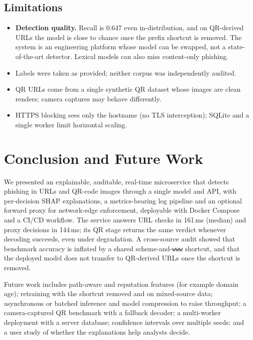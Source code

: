 \documentclass[conference]{IEEEtran}
\begin{document}
\subsection{Limitations}
\begin{itemize}
\item \textbf{Detection quality.} Recall is 0.647 even in-distribution, and on QR-derived URLs the model is close to chance once the prefix shortcut is removed. The system is an engineering platform whose model can be swapped, not a state-of-the-art detector. Lexical models can also miss content-only phishing.
\item Labels were taken as provided; neither corpus was independently audited.
\item QR URLs come from a single synthetic QR dataset whose images are clean renders; camera captures may behave differently.
\item HTTPS blocking sees only the hostname (no TLS interception); SQLite and a single worker limit horizontal scaling.
\end{itemize}

\section{Conclusion and Future Work}
We presented an explainable, auditable, real-time microservice that detects phishing in URLs and QR-code images through a single model and API, with per-decision SHAP explanations, a metrics-bearing log pipeline and an optional forward proxy for network-edge enforcement, deployable with Docker Compose and a CI/CD workflow. The service answers URL checks in 161\,ms (median) and proxy decisions in 144\,ms; its QR stage returns the same verdict whenever decoding succeeds, even under degradation. A cross-source audit showed that benchmark accuracy is inflated by a shared scheme-and-\texttt{www} shortcut, and that the deployed model does not transfer to QR-derived URLs once the shortcut is removed.

Future work includes path-aware and reputation features (for example domain age); retraining with the shortcut removed and on mixed-source data; asynchronous or batched inference and model compression to raise throughput; a camera-captured QR benchmark with a fallback decoder; a multi-worker deployment with a server database; confidence intervals over multiple seeds; and a user study of whether the explanations help analysts decide.
\end{document}

